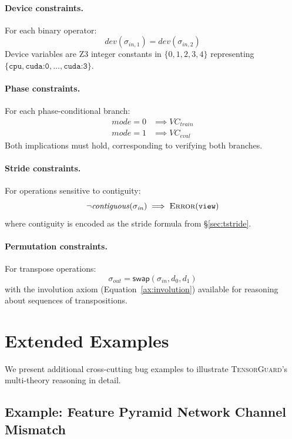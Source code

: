 \documentclass[10pt]{article}
\newcommand{\tguard}{\textsc{TensorGuard}}
\theoremstyle{plain}
\theoremstyle{definition}
\theoremstyle{remark}
\begin{document}
\paragraph{Device constraints.}
For each binary operator:
\[
  \mathit{dev}(\sigma_{\mathit{in},1}) = \mathit{dev}(\sigma_{\mathit{in},2})
\]
Device variables are Z3 integer constants in $\{0, 1, 2, 3, 4\}$
representing $\{\texttt{cpu}, \texttt{cuda:0}, \ldots, \texttt{cuda:3}\}$.

\paragraph{Phase constraints.}
For each phase-conditional branch:
\begin{align*}
  \mathit{mode} = 0 &\implies \mathit{VC}_{\mathit{train}} \\
  \mathit{mode} = 1 &\implies \mathit{VC}_{\mathit{eval}}
\end{align*}
Both implications must hold, corresponding to verifying both branches.

\paragraph{Stride constraints.}
For operations sensitive to contiguity:
\[
  \neg\mathit{contiguous}(\sigma_{\mathit{in}}) \implies
    \textsc{Error}(\texttt{view})
\]
where contiguity is encoded as the stride formula from \S\ref{sec:tstride}.

\paragraph{Permutation constraints.}
For transpose operations:
\[
  \sigma_{\mathit{out}} = \mathsf{swap}(\sigma_{\mathit{in}}, d_0, d_1)
\]
with the involution axiom (Equation~\ref{ax:involution}) available
for reasoning about sequences of transpositions.


\section{Extended Examples}\label{sec:extended-examples}

We present additional cross-cutting bug examples to illustrate
\tguard{}'s multi-theory reasoning in detail.

\subsection{Example: Feature Pyramid Network Channel Mismatch}
\end{document}
